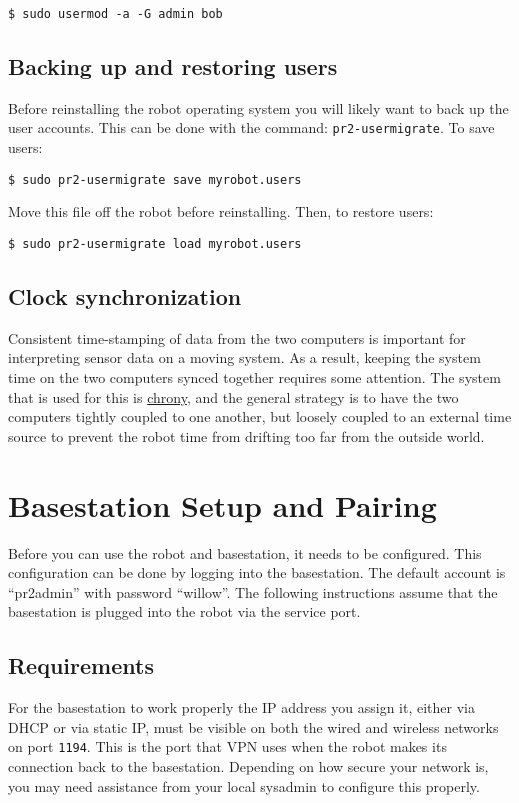 \begin{verbatim}
$ sudo usermod -a -G admin bob
\end{verbatim}

\subsection{Backing up and restoring users}
Before reinstalling the robot operating system you will likely want to
back up the user accounts. This can be done with the command:
\texttt{pr2-usermigrate}. To save users:
\begin{verbatim}
$ sudo pr2-usermigrate save myrobot.users
\end{verbatim}

Move this file off the robot before reinstalling.  Then, to restore users:
\begin{verbatim}
$ sudo pr2-usermigrate load myrobot.users
\end{verbatim}


\subsection{Clock synchronization}
Consistent time-stamping of data from the two computers is important
for interpreting sensor data on a moving system.  As a result, keeping
the system time on the two computers synced together requires some
attention.  The system that is used for this is
\href{http://chrony.tuxfamily.org/}{chrony}, and the general strategy
is to have the two computers tightly coupled to one another, but
loosely coupled to an external time source to prevent the robot time
from drifting too far from the outside world.

\section{Basestation Setup and Pairing}
Before you can use the robot and basestation, it needs to be
configured.  This configuration can be done by logging into the
basestation.  The default account is ``pr2admin'' with password
``willow''.  The following instructions assume that the basestation is
plugged into the robot via the service port.

\subsection{Requirements}
For the basestation to work properly the IP address you assign it,
either via DHCP or via static IP, must be visible on both the wired
and wireless networks on port \texttt{1194}.  This is the port that
VPN uses when the robot makes its connection back to the basestation.
Depending on how secure your network is, you may need assistance from
your local sysadmin to configure this properly.

